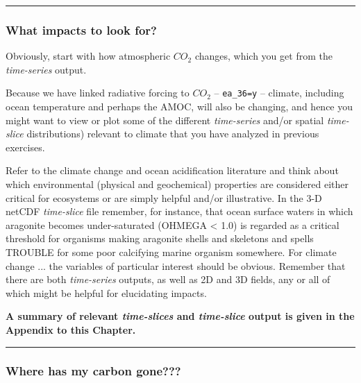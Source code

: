 \vspace{1mm}\noindent\rule{4cm}{0.1mm}\vspace{2mm}

\newpage

\subsubsection*{What impacts to look for?}
 
\noindent Obviously, start with how atmospheric $CO_{2}$ changes, which you get from the \textit{time-series} output.

Because we have linked radiative forcing to $CO_2$ -- \texttt{\small ea\_36=y} -- climate, including ocean temperature and perhaps the AMOC, will also be changing, and hence you might want to view or plot some of the different \textit{time-series} and/or spatial \textit{time-slice} distributions) relevant to climate that you have analyzed in previous exercises.

Refer to the climate change and ocean acidification literature and think about which environmental (physical and geochemical) properties are considered either critical for ecosystems or are simply helpful and/or illustrative. In the 3-D netCDF \textit{time-slice} file remember, for instance, that ocean surface waters in which aragonite becomes under-saturated (OHMEGA < 1.0) is regarded as a critical threshold for organisms making aragonite shells and skeletons and spells TROUBLE for some poor calcifying marine organism somewhere. For climate change ... the variables of particular interest should be obvious. Remember that there are both \textit{time-series} outputs, as well as  2D and 3D fields, any or all of which might be  helpful for elucidating impacts.

\vspace{1mm} 
\noindent \textbf{A summary of relevant \textit{time-slices} and \textit{time-slice} output is given in the Appendix to this Chapter.}

\vspace{1mm}\noindent\rule{4cm}{0.1mm}\vspace{2mm}

\subsubsection*{Where has my carbon gone???}

